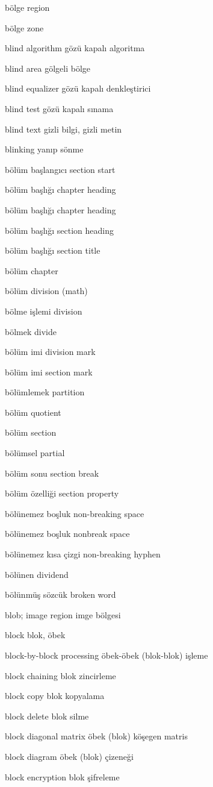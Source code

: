 \documentclass[12pt,fleqn]{article}\usepackage{../../common}
\begin{document}
bölge region

bölge zone

blind algorithm gözü kapalı algoritma

blind area gölgeli bölge

blind equalizer gözü kapalı denkleştirici

blind test gözü kapalı sınama

blind text gizli bilgi, gizli metin

blinking yanıp sönme

bölüm başlangıcı section start

bölüm başlığı chapter heading

bölüm başlığı chapter heading

bölüm başlığı section heading

bölüm başlığı section title

bölüm chapter

bölüm division (math)

bölme işlemi division

bölmek divide

bölüm imi division mark

bölüm imi section mark

bölümlemek partition

bölüm quotient

bölüm section

bölümsel partial

bölüm sonu section break

bölüm özelliği section property

bölünemez boşluk non-breaking space

bölünemez boşluk nonbreak space

bölünemez kısa çizgi non-breaking hyphen

bölünen dividend

bölünmüş sözcük broken word

blob; image region imge bölgesi

block blok, öbek

block-by-block processing öbek-öbek (blok-blok) işleme

block chaining blok zincirleme

block copy blok kopyalama

block delete blok silme

block diagonal matrix öbek (blok) köşegen matris

block diagram öbek (blok) çizeneği

block encryption blok şifreleme
\end{document}
